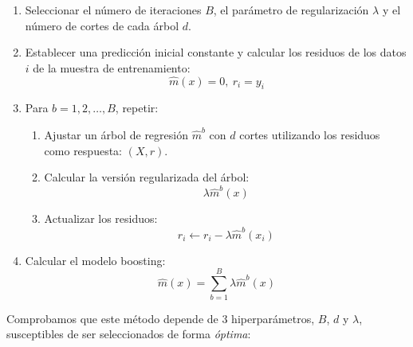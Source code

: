 \documentclass[]{book}
\theoremstyle{break}
\theoremstyle{definition}
\theoremstyle{definition}
\theoremstyle{definition}
\theoremstyle{remark}
\begin{document}
\begin{enumerate}
\def\labelenumi{\arabic{enumi}.}
\item
  Seleccionar el número de iteraciones \(B\), el parámetro de
  regularización \(\lambda\) y el número de cortes de cada árbol \(d\).
\item
  Establecer una predicción inicial constante y calcular los residuos de
  los datos \(i\) de la muestra de entrenamiento:
  \[\hat m (x) = 0, \ r_i = y_i\]
\item
  Para \(b = 1, 2,\ldots, B\), repetir:

  \begin{enumerate}
  \def\labelenumii{\alph{enumii}.}
  \item
    Ajustar un árbol de regresión \(\hat m^b\) con \(d\) cortes
    utilizando los residuos como respuesta: \((X, r)\).
  \item
    Calcular la versión regularizada del árbol: \[\lambda \hat m^b (x)\]
  \item
    Actualizar los residuos:
    \[r_i \leftarrow r_i - \lambda \hat m^b (x_i)\]
  \end{enumerate}
\item
  Calcular el modelo boosting:
  \[\hat m (x) = \sum_{b=1}^{B} \lambda \hat m^b (x)\]
\end{enumerate}

Comprobamos que este método depende de 3 hiperparámetros, \(B\), \(d\) y
\(\lambda\), susceptibles de ser seleccionados de forma \emph{óptima}:
\end{document}
